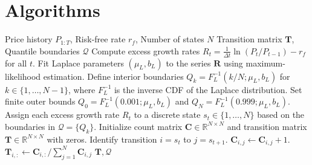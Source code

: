 \section*{Algorithms}\label{app:algo}

\begin{algorithm}[htpb]
\caption{Empirical hidden Markov model construction via Laplace partitioning}
\label{alg:build}
\begin{algorithmic}[1]
\REQUIRE Price history $P_{1:T}$, Risk-free rate $r_f$, Number of states $N$
\ENSURE Transition matrix $\mathbf{T}$, Quantile boundaries $\mathcal{Q}$
\STATE Compute excess growth rates $R_t = \frac{1}{\Delta t} \ln(P_t / P_{t-1}) - r_f$ for all $t$.
\STATE Fit Laplace parameters $(\mu_L, b_L)$ to the series $\mathbf{R}$ using maximum-likelihood estimation.
\STATE Define interior boundaries $Q_k = F_L^{-1}(k/N; \mu_L, b_L)$ for $k \in \{1, \dots, N-1\}$, where $F_L^{-1}$ is the inverse CDF of the Laplace distribution.
\STATE Set finite outer bounds $Q_0 = F_L^{-1}(0.001; \mu_L, b_L)$ and $Q_N = F_L^{-1}(0.999; \mu_L, b_L)$.
\STATE Assign each excess growth rate $R_t$ to a discrete state $s_t \in \{1, \dots, N\}$ based on the boundaries in $\mathcal{Q} = \{Q_k\}$.
\STATE Initialize count matrix $\mathbf{C} \in \mathbb{R}^{N \times N}$ and transition matrix $\mathbf{T} \in \mathbb{R}^{N \times N}$ with zeros.
    \STATE Identify transition $i = s_t$ to $j = s_{t+1}$.
\STATE $\mathbf{C}_{i,j} \leftarrow \mathbf{C}_{i,j} + 1$.
\ENDFOR
{}
    \STATE $\mathbf{T}_{i,:} \leftarrow \mathbf{C}_{i,:} / \sum_{j=1}^{N} \mathbf{C}_{i,j}$ 
\ENDFOR
\RETURN $\mathbf{T}, \mathcal{Q}$
\end{algorithmic}
\end{algorithm}

\clearpage


